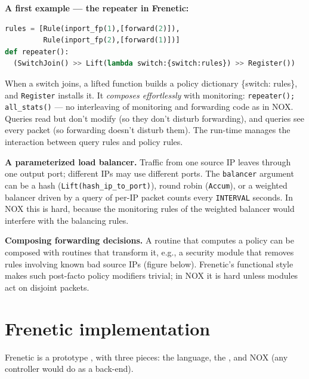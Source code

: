 \textbf{A first example --- the repeater in Frenetic:}
\begin{lstlisting}[language=Python]
rules = [Rule(inport_fp(1),[forward(2)]),
         Rule(inport_fp(2),[forward(1)])]
def repeater():
  (SwitchJoin() >> Lift(lambda switch:{switch:rules}) >> Register())
\end{lstlisting}
When a switch joins, a lifted function builds a policy dictionary \{switch: rules\}, and \texttt{Register} installs it. It \emph{composes effortlessly} with monitoring: \texttt{repeater(); all\_stats()} --- no interleaving of monitoring and forwarding code as in NOX. Queries read but don't modify (so they don't disturb forwarding), and queries see every packet (so forwarding doesn't disturb them). The run-time manages the interaction between query rules and policy rules.

\textbf{A parameterized load balancer.} Traffic from one source IP leaves through one output port; different IPs may use different ports.
The \texttt{balancer} argument can be a hash (\texttt{Lift(hash\_ip\_to\_port)}), round robin (\texttt{Accum}), or a weighted balancer driven by a query of per-IP packet counts every \texttt{INTERVAL} seconds. In NOX this is hard, because the monitoring rules of the weighted balancer would interfere with the balancing rules.

\textbf{Composing forwarding decisions.} A routine that computes a policy can be composed with routines that transform it, e.g., a security module that removes rules involving known bad source IPs (figure below). Frenetic's functional style makes such post-facto policy modifiers trivial; in NOX it is hard unless modules act on disjoint packets.

\section{Frenetic implementation}
Frenetic is a prototype , with three pieces: the language, the , and NOX (any controller would do as a back-end).

